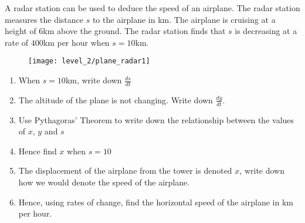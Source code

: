 A radar station can be used to deduce the speed of an airplane. The radar station measures the distance $s$ to the airplane in km. The airplane is cruising at a height of 6km above the ground. The radar station finds that $s$ is decreasing at a rate of $400$km per hour when $s=10$km.
\begin{figure}[H]
	\centering
	\texttt{[image: level\_2/plane\_radar1]}
\end{figure}
\begin{enumerate}
	\item When $s=10$km, write down $\frac{ds}{dt}$
	\item The altitude of the plane is not changing. Write down $\frac{dy}{dt}$.
	\item Use Pythagoras' Theorem to write down the relationship between the values of $x$, $y$ and $s$
	\item Hence find $x$ when $s=10$
	\item The displacement of the airplane from the tower is denoted $x$, write down how we would denote the speed of the airplane.
	\item Hence, using rates of change, find the horizontal speed of the airplane in km per hour.
\end{enumerate}
